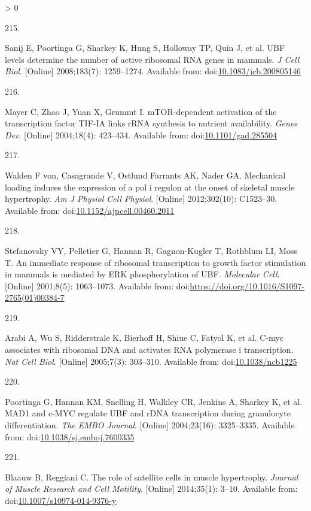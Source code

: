 \documentclass[twoside,10pt]{gihclass} %
\newlength{\cslhangindent}
\newlength{\csllabelwidth}
\newenvironment{CSLReferences}[3] %
 {%
  \setlength{\parindent}{0pt}
  \ifodd #1 \everypar{\setlength{\hangindent}{\cslhangindent}}\ignorespaces\fi
  \ifnum #2 > 0
  \setlength{\parskip}{#2\baselineskip}
  \fi
 }%
 {}
\newcommand{\CSLLeftMargin}[1]{\parbox[t]{\maxof{\widthof{#1}}{\csllabelwidth}}{#1}}
\newcommand{\CSLRightInline}[1]{\parbox[t]{\linewidth}{#1}}
\begin{document}
\begin{CSLReferences}{0}{0}
\leavevmode\hypertarget{ref-RN2556}{}%
\CSLLeftMargin{215. }
\CSLRightInline{Sanij E, Poortinga G, Sharkey K, Hung S, Holloway TP, Quin J, et al. UBF levels determine the number of active ribosomal RNA genes in mammals. \emph{J Cell Biol}. {[}Online{]} 2008;183(7): 1259--1274. Available from: doi:\href{https://doi.org/10.1083/jcb.200805146}{10.1083/jcb.200805146}}

\leavevmode\hypertarget{ref-RN2851}{}%
\CSLLeftMargin{216. }
\CSLRightInline{Mayer C, Zhao J, Yuan X, Grummt I. mTOR-dependent activation of the transcription factor TIF-IA links rRNA synthesis to nutrient availability. \emph{Genes Dev}. {[}Online{]} 2004;18(4): 423--434. Available from: doi:\href{https://doi.org/10.1101/gad.285504}{10.1101/gad.285504}}

\leavevmode\hypertarget{ref-RN1828}{}%
\CSLLeftMargin{217. }
\CSLRightInline{Walden F von, Casagrande V, Ostlund Farrants AK, Nader GA. Mechanical loading induces the expression of a pol i regulon at the onset of skeletal muscle hypertrophy. \emph{Am J Physiol Cell Physiol}. {[}Online{]} 2012;302(10): C1523--30. Available from: doi:\href{https://doi.org/10.1152/ajpcell.00460.2011}{10.1152/ajpcell.00460.2011}}

\leavevmode\hypertarget{ref-RN2604}{}%
\CSLLeftMargin{218. }
\CSLRightInline{Stefanovsky VY, Pelletier G, Hannan R, Gagnon-Kugler T, Rothblum LI, Moss T. An immediate response of ribosomal transcription to growth factor stimulation in mammals is mediated by ERK phosphorylation of UBF. \emph{Molecular Cell}. {[}Online{]} 2001;8(5): 1063--1073. Available from: doi:\url{https://doi.org/10.1016/S1097-2765(01)00384-7}}

\leavevmode\hypertarget{ref-RN1834}{}%
\CSLLeftMargin{219. }
\CSLRightInline{Arabi A, Wu S, Ridderstrale K, Bierhoff H, Shiue C, Fatyol K, et al. C-myc associates with ribosomal DNA and activates RNA polymerase i transcription. \emph{Nat Cell Biol}. {[}Online{]} 2005;7(3): 303--310. Available from: doi:\href{https://doi.org/10.1038/ncb1225}{10.1038/ncb1225}}

\leavevmode\hypertarget{ref-RN2565}{}%
\CSLLeftMargin{220. }
\CSLRightInline{Poortinga G, Hannan KM, Snelling H, Walkley CR, Jenkins A, Sharkey K, et al. MAD1 and c-MYC regulate UBF and rDNA transcription during granulocyte differentiation. \emph{The EMBO Journal}. {[}Online{]} 2004;23(16): 3325--3335. Available from: doi:\href{https://doi.org/10.1038/sj.emboj.7600335}{10.1038/sj.emboj.7600335}}

\leavevmode\hypertarget{ref-RN2080}{}%
\CSLLeftMargin{221. }
\CSLRightInline{Blaauw B, Reggiani C. The role of satellite cells in muscle hypertrophy. \emph{Journal of Muscle Research and Cell Motility}. {[}Online{]} 2014;35(1): 3--10. Available from: doi:\href{https://doi.org/10.1007/s10974-014-9376-y}{10.1007/s10974-014-9376-y}}


\end{CSLReferences}
\end{document}
